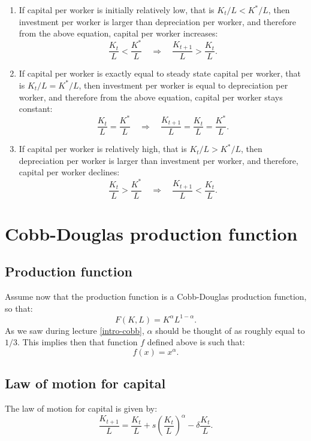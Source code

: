 \documentclass[]{book}
\begin{document}
\begin{enumerate}
\def\labelenumi{\arabic{enumi}.}
\item
  If capital per worker is initially relatively low, that is
  \(K_{t}/L<K^{*}/L\), then investment per worker is larger than
  depreciation per worker, and therefore from the above equation,
  capital per worker increases:
  \[\boxed{\frac{K_t}{L}<\frac{K^{*}}{L} \quad \Rightarrow \quad \frac{K_{t+1}}{L}>\frac{K_{t}}{L}}.\]
\item
  If capital per worker is exactly equal to steady state capital per
  worker, that is \(K_{t}/L=K^{*}/L\), then investment per worker is
  equal to depreciation per worker, and therefore from the above
  equation, capital per worker stays constant:
  \[\boxed{\frac{K_t}{L}=\frac{K^{*}}{L} \quad \Rightarrow \quad \frac{K_{t+1}}{L}=\frac{K_{t}}{L}=\frac{K^{*}}{L}}.\]
\item
  If capital per worker is relatively high, that is \(K_{t}/L>K^{*}/L\),
  then depreciation per worker is larger than investment per worker, and
  therefore, capital per worker declines:
  \[\boxed{\frac{K_t}{L}>\frac{K^{*}}{L} \quad \Rightarrow \quad \frac{K_{t+1}}{L}<\frac{K_{t}}{L}}.\]
\end{enumerate}

\section{Cobb-Douglas production function}\label{cobb}

\subsection{Production function}\label{production-function}

Assume now that the production function is a Cobb-Douglas production
function, so that:\\
\[F(K,L)=K^{\alpha}L^{1-\alpha}.\] As we saw during lecture
\ref{intro-cobb}, \(\alpha\) should be thought of as roughly equal to
\(1/3\). This implies then that function \(f\) defined above is such
that: \[f(x)=x^{\alpha}.\]

\subsection{Law of motion for capital}\label{law-of-motion-for-capital}

The law of motion for capital is given by:\\
\[\frac{K_{t+1}}{L}=\frac{K_{t}}{L}+s\left(\frac{K_{t}}{L}\right)^{\alpha}-\delta\frac{K_{t}}{L}.\]
\end{document}
